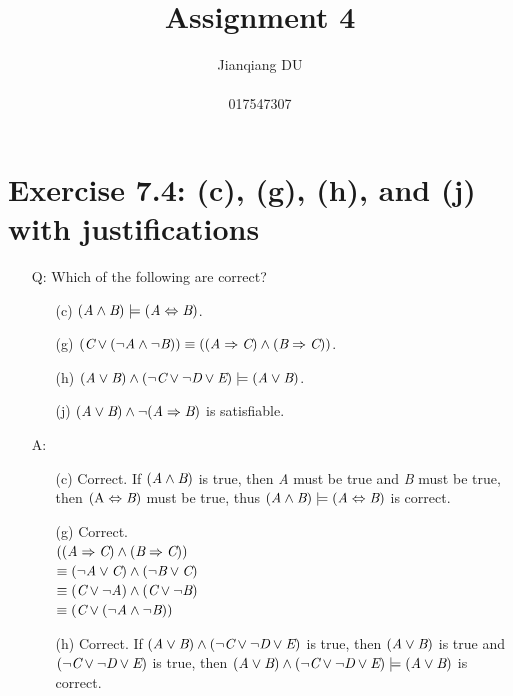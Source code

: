 \documentclass{article}
\begin{document}
\title{\LARGE Assignment 4}
\author{Jianqiang DU\\\\017547307}
\maketitle

\section{Exercise 7.4: (c), (g), (h), and (j) with justifications}
\begin{itemize}
\item[Q:]Which of the following are correct?
\begin{itemize}
\item[(c)]$(\textit A \wedge \textit B) \models (\textit A \Leftrightarrow \textit B)$.
\item[(g)]$(\textit C \vee (\neg \textit A \wedge \neg \textit B)) \equiv ((\textit A \Rightarrow \textit C) \wedge (\textit B \Rightarrow \textit C))$.
\item[(h)]$(\textit A \vee \textit B) \wedge (\neg \textit C \vee \neg \textit D \vee \textit E) \models (\textit A \vee \textit B)$.
\item[(j)]$(\textit A \vee \textit B) \wedge \neg (\textit A \Rightarrow \textit B)$ is satisfiable.
\end{itemize}
\item[A:]
\begin{itemize}
\item[(c)]Correct. If $(\textit A \wedge \textit B)$ is true, then \textit A must be true and \textit B must be true, then $(\text A \Leftrightarrow \textit B)$ must be true, thus $(\textit A \wedge \textit B) \models (\textit A \Leftrightarrow \textit B)$ is correct.
\item[(g)]Correct.\\$((\textit A \Rightarrow \textit C) \wedge (\textit B \Rightarrow \textit C))$\\$\equiv (\neg \textit A \vee \textit C) \wedge (\neg \textit B \vee \textit C)$\\$\equiv (\textit C \vee \neg \textit A) \wedge (\textit C \vee \neg \textit B)$\\$\equiv (\textit C \vee (\neg \textit A \wedge \neg \textit B))$
\item[(h)]Correct. If $(\textit A \vee \textit B) \wedge (\neg \textit C \vee \neg \textit D \vee \textit E)$ is true, then $(\textit A \vee \textit B)$ is true and $(\neg \textit C \vee \neg \textit D \vee \textit E)$ is true, then $(\textit A \vee \textit B) \wedge (\neg \textit C \vee \neg \textit D \vee \textit E) \models (\textit A \vee \textit B)$ is correct.

\end{itemize}
\end{itemize}
\end{document}
